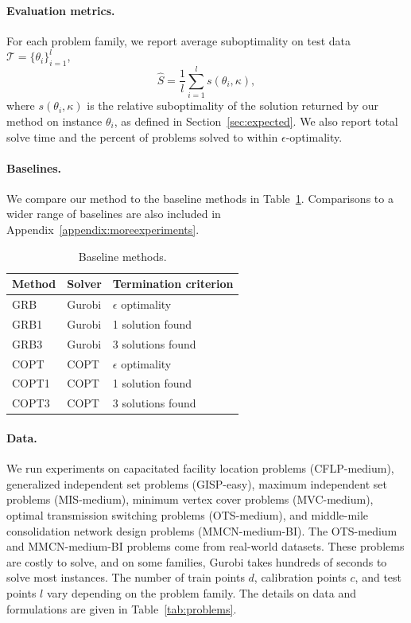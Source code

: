 \documentclass[12pt]{article}
\theoremstyle{definition}
\theoremstyle{remark}
\newcommand{\param}{\theta}
\newcommand{\tol}{\epsilon}
\newcommand{\termov}{s}
\newcommand{\lt}{\kappa}
\newcommand{\test}{\mathcal{T}}
\newcommand{\ncalib}{c}
\newcommand{\ntrain}{d}
\newcommand{\ntest}{l}
\newcommand{\change}[1]{#1}
\newcommand{\param}{\theta}
\newcommand{\tol}{\epsilon}
\newcommand{\termov}{s}
\newcommand{\lt}{\kappa}
\newcommand{\test}{\mathcal{T}}
\newcommand{\ncalib}{c}
\newcommand{\ntrain}{d}
\newcommand{\ntest}{l}
\newcommand{\change}[1]{#1}
\theoremstyle{plain}
\theoremstyle{definition}
\theoremstyle{remark}
\begin{document}
\paragraph{Evaluation metrics.}
For each problem family, we report average suboptimality on test data $\test = \{\param_i\}_{i=1}^\ntest$,
\begin{equation*}
    \hat{S} = \frac{1}{\ntest}\sum_{i=1}^\ntest \termov(\param_i, \lt),
\end{equation*}
where $\termov(\param_i, \lt)$ is the relative suboptimality of the solution returned by our method on instance $\param_i$, as defined in Section~\ref{sec:expected}.
We also report total solve time and the percent of problems solved to within $\tol$-optimality.
\paragraph{Baselines.}
We compare our method to the baseline methods in Table~\ref{tab:baselines}.
\change{Comparisons to a wider range of baselines are also included in Appendix~\ref{appendix:moreexperiments}.}
\begin{table}[h]
	\centering
	\caption{Baseline methods.}
	\label{tab:baselines}
	\begin{tabular}{lll}
		\toprule
		Method & Solver & Termination criterion \\
		\midrule
		GRB & Gurobi & $\tol$ optimality \\
		GRB1 & Gurobi & 1 solution found \\
		GRB3 & Gurobi & 3 solutions found \\
		COPT & COPT & $\tol$ optimality \\
		COPT1 & COPT & 1 solution found \\
		COPT3 & COPT & 3 solutions found \\
		\bottomrule
	\end{tabular}
\end{table}

\paragraph{Data.}
We run experiments on capacitated facility location problems (CFLP-medium), generalized independent set problems (GISP-easy), maximum independent set problems (MIS-medium), minimum vertex cover problems (MVC-medium), optimal transmission switching problems (OTS-medium), and middle-mile consolidation network design problems (MMCN-medium-BI).
The OTS-medium and MMCN-medium-BI problems come from real-world datasets.
 These problems are costly to solve, and on some families, Gurobi takes hundreds of seconds to solve most instances.
The number of train points $\ntrain$, calibration points $\ncalib$, and test points $\ntest$ vary depending on the problem family.
The details on data and formulations are given in Table~\ref{tab:problems}.
\end{document}
